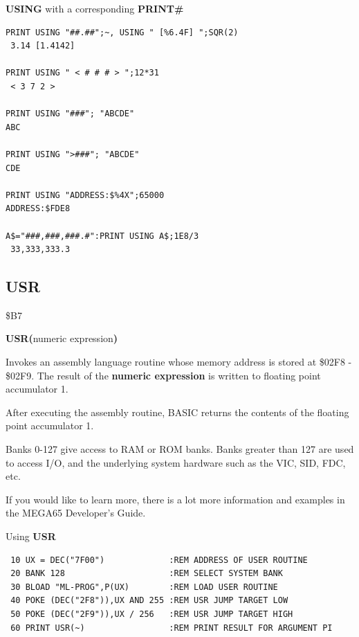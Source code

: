 \begin{description}[leftmargin=2cm,style=nextline]
\newpage
\item [Example:] {\bf USING} with a corresponding {\bf PRINT\#}

\begin{tcolorbox}[colback=black,coltext=white]
\verbatimfont{\codefont}
\begin{verbatim}
PRINT USING "##.##";~, USING " [%6.4F] ";SQR(2)
 3.14 [1.4142]

PRINT USING " < # # # > ";12*31
 < 3 7 2 >

PRINT USING "###"; "ABCDE"
ABC

PRINT USING ">###"; "ABCDE"
CDE

PRINT USING "ADDRESS:$%4X";65000
ADDRESS:$FDE8

A$="###,###,###.#":PRINT USING A$;1E8/3
 33,333,333.3
\end{verbatim}
\end{tcolorbox}
\end{description}


\newpage
\subsection{USR}
\begin{description}[leftmargin=2cm,style=nextline]
\item [Token:] \$B7
\item [Format:] {\bf USR(}numeric expression{\bf)}
\item [Usage:] Invokes an assembly language routine whose memory
               address is stored at  \$02F8 - \$02F9. The
               result of the {\bf numeric expression}
               is written to floating point accumulator 1.

               After executing the assembly routine, BASIC returns
               the contents of the floating point accumulator 1.

\item [Remarks:] Banks 0-127 give access to RAM or ROM banks.
                 Banks greater than 127 are used to access I/O, and the underlying system hardware such as the
                 VIC, SID, FDC, etc.

                 If you would like to learn more, there is a lot more
                 information and examples in the MEGA65 Developer's Guide.

\item [Example:] Using {\bf USR}

\begin{tcolorbox}[colback=black,coltext=white]
\verbatimfont{\codefont}
\begin{verbatim}
 10 UX = DEC("7F00")             :REM ADDRESS OF USER ROUTINE
 20 BANK 128                     :REM SELECT SYSTEM BANK
 30 BLOAD "ML-PROG",P(UX)        :REM LOAD USER ROUTINE
 40 POKE (DEC("2F8")),UX AND 255 :REM USR JUMP TARGET LOW
 50 POKE (DEC("2F9")),UX / 256   :REM USR JUMP TARGET HIGH
 60 PRINT USR(~)                 :REM PRINT RESULT FOR ARGUMENT PI
\end{verbatim}
\end{tcolorbox}
\end{description}


